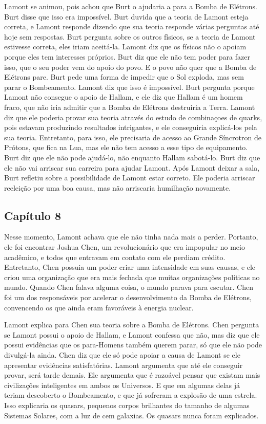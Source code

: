 \documentclass[14pt,portuguese]{extreport}
\begin{document}
	  Lamont se animou, pois achou que Burt o ajudaria a para a Bomba de Elétrons. Burt disse que 
	  isso era impossível. Burt duvida que a teoria de Lamont esteja correta, e Lamont responde 
	  dizendo que sua teoria responde várias perguntas até hoje sem respostas. Burt pergunta 
	  sobre os outros físicos, se a teoria de Lamont estivesse correta, eles iriam aceitá-la. 
	  Lamont diz que os físicos não o apoiam porque eles tem interesses próprios. Burt diz que 
	  ele não tem poder para fazer isso, que o seu poder vem do apoio do povo. E o povo não quer 
	  que a Bomba de Elétrons pare. Burt pede uma forma de impedir que o Sol exploda, mas sem 
	  parar o Bombeamento. Lamont diz que isso é impossível. Burt pergunta porque Lamont não 
	  consegue o apoio de Hallam, e ele diz que Hallam é um homem fraco, que não iria admitir que 
	  a Bomba de Elétrons destruiria a Terra. Lamont diz que ele poderia provar sua teoria através 
	  do estudo de combinaçoes de quarks, pois estavam produzindo resultados intrigantes, e ele 
	  conseguiria explicá-los pela sua teoria. Entretanto, para isso, ele precisaria de acesso 
	  ao Grande Síncrotron de Prótons, que fica na Lua, mas ele não tem acesso a esse tipo de 
	  equipamento. Burt diz que ele não pode ajudá-lo, não enquanto Hallam sabotá-lo. Burt diz 
	  que ele não vai arriscar sua carreira para ajudar Lamont. Após Lamont deixar a sala, Burt 
	  refletiu sobre a possibilidade de Lamont estar correto. Ele poderia arriscar reeleição por uma 
	  boa causa, mas não arriscaria humilhação novamente.

	\subsection{Capítulo 8}

	  Nesse momento, Lamont achava que ele não tinha nada mais a perder. Portanto, ele foi 
	  encontrar Joshua Chen, um revolucionário que era impopular no meio acadêmico, e todos que 
	  entravam em contato com ele perdiam crédito. Entretanto, Chen possuia um poder criar uma 
	  intensidade em suas causas, e ele criou uma organização que era mais fechada que muitas 
	  organizações políticas no mundo. Quando Chen falava alguma coisa, o mundo parava para 
	  escutar. Chen foi um dos responsáveis por acelerar o desenvolvimento da Bomba de Elétrons, 
	  convencendo os que ainda eram favoráveis à energia nuclear.
	  
	  Lamont explica para Chen sua teoria sobre a Bomba de Elétrons. Chen pergunta se Lamont possui 
	  o apoio de Hallam, e Lamont confessa que não, mas diz que ele possui evidências que os 
	  para-Homens também querem parar, só que ele não pode divulgá-la ainda. Chen diz que ele só 
	  pode apoiar a causa de Lamont se ele apresentar evidências satisfatórias. Lamont argumenta 
	  que até ele conseguir provar, será tarde demais. Ele argumenta que é razoável pensar que 
	  existam mais civilizações inteligentes em ambos os Universos. E que em algumas delas já 
	  teriam descoberto o Bombeamento, e que já sofreram a explosão de uma estrela. Isso explicaria 
	  os quasars, pequenos corpos brilhantes do tamanho de algumas Sistemas Solares, com a luz de 
	  cem galaxias. Os quasars nunca foram explicados.
	  
\end{document}
